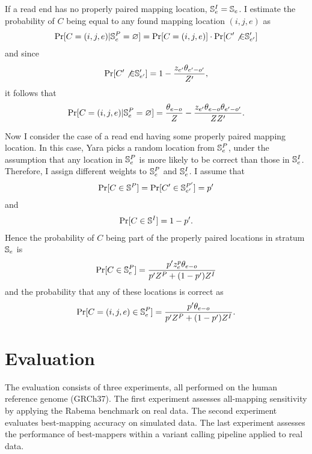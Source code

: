 If a read end has no properly paired mapping location, $\mathbb{S}^I_e = \mathbb{S}_e$.
I estimate the probability of $C$ being equal to any found mapping location $(i,j,e)$ as
\begin{eqnarray}
\Pr[C = (i,j,e) | \mathbb{S}^P_e = \varnothing] = \Pr[C = (i,j,e)] \cdot \Pr[C' \not{\in} \mathbb{S}'_{e'}]
\end{eqnarray}
and since
\begin{eqnarray}
\Pr[C' \not{\in} \mathbb{S}'_{e'}] = 1 - \frac{z_{e'}\theta_{e'-o'}}{Z'},
\end{eqnarray}
it follows that
\begin{eqnarray}
\label{eq:yara:mqual:pe:unpaired}
\Pr[C = (i,j,e) | \mathbb{S}^P_e = \varnothing] = \frac{\theta_{e-o}}{Z} - \frac{z_{e'} \theta_{e-o} \theta_{e'-o'}}{ZZ'}.
\end{eqnarray}

Now I consider the case of a read end having some properly paired mapping location.
In this case, Yara picks a random location from $\mathbb{S}^P_e$, under the assumption that any location in $\mathbb{S}^P_e$ is more likely to be correct than those in $\mathbb{S}^I_e$.
Therefore, I assign different weights to $\mathbb{S}^P_e$ and $\mathbb{S}^I_e$.
I assume that
\begin{eqnarray}
\Pr[C \in \mathbb{S}^P] = \Pr[C' \in \mathbb{S}^{P'}_{e'}] = p'
\end{eqnarray}
and 
\begin{eqnarray}
\Pr[C \in \mathbb{S}^I] = 1 - p'.
\end{eqnarray}
Hence the probability of $C$ being part of the properly paired locations in stratum $\mathbb{S}_e$ is
\begin{eqnarray}
\label{eq:yara:mqual:pe:stratum}
\Pr[C \in \mathbb{S}^P_e] = \frac{p' z^p_e \theta_{e-o}}{p' Z^P + (1-p') Z^I}
\end{eqnarray}
and the probability that any of these locations is correct as
\begin{eqnarray}
\label{eq:yara:mqual:pe:paired}
\Pr[C = (i,j,e) \in \mathbb{S}^P_e] = \frac{p' \theta_{e-o}}{p' Z^P + (1-p') Z^I}.
\end{eqnarray}



\section{Evaluation}
\label{sec:yara:eval}

The evaluation consists of three experiments, all performed on the human reference genome (GRCh37).
The first experiment assesses all-mapping sensitivity by applying the Rabema benchmark on real data.
The second experiment evaluates best-mapping accuracy on simulated data.
The last experiment assesses the performance of best-mappers within a variant calling pipeline applied to real data.

